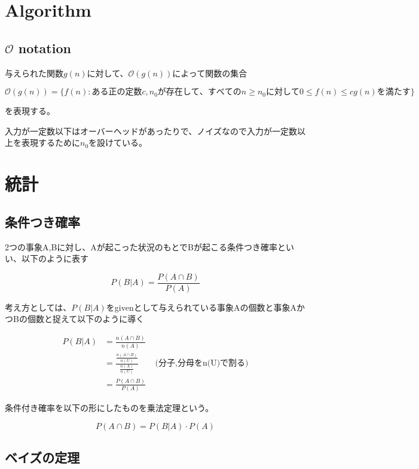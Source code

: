 \documentclass[dvipdfmx]{jsarticle}
\begin{document}
\section{Algorithm}

\subsection{$\mathcal{O}$ notation}

与えられた関数$g(n)$に対して、$\mathcal{O}(g(n))$によって関数の集合


\[ \mathcal{O}(g(n)) = \{ f(n): ある正の定数c, n_0が存在して、すべてのn \ge n_0に対して0 \le f(n) \le cg(n)を満たす\} \]


を表現する。

入力が一定数以下はオーバーヘッドがあったりで、ノイズなので入力が一定数以上を表現するために$n_0$を設けている。

\section{統計}

\subsection{条件つき確率}

2つの事象A,Bに対し、Aが起こった状況のもとでBが起こる条件つき確率といい、以下のように表す

\[ P(B|A) = \frac{P(A \cap B) }{P(A)} \]

考え方としては、$P(B|A)$をgivenとして与えられている事象Aの個数と事象AかつBの個数と捉えて以下のように導く

\begin{align*}
  P(B|A) &= \frac{n(A\cap B)}{n(A)} \\
         &= \frac{\frac{n(A\cap B)}{n(U)}}{\frac{n(A)}{n(U)}} \qquad \text{(分子,分母をn(U)で割る)} \\
         &= \frac{P(A \cap B)}{P(A)}
\end{align*}

条件付き確率を以下の形にしたものを乗法定理という。

\[ P(A \cap B) = P(B|A) \cdot P(A) \]

\subsection{ベイズの定理}

\newcommand{\highlight}[3][yellow]{\tikz[baseline=(x.base)]{\node[rectangle,rounded corners,fill=#1!10](x){#2} node[below of=x, color=#1]{#3};}}
\end{document}
